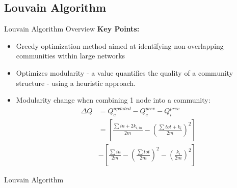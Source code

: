 \documentclass[compress]{beamer}
\begin{document}
\subsection{Louvain Algorithm}
\begin{frame}[t]{ Louvain Algorithm Overview}
    \textbf{Key Points:}
    \begin{itemize}
        \item  Greedy optimization method aimed at identifying non-overlapping communities within large networks
        \item  Optimizes modularity - a value quantifies the quality of a community structure - using a heuristic approach.
        \item Modularity change when combining 1 node into a community:
\[
\begin{aligned}
    \Delta Q&=Q_c^{updated}-Q_c^{prev}-Q_i^{prev}\\
    &=\left[\frac{\sum in + 2 k_{i,in}}{2m}-\left(\frac{\sum tot+k_i}{2m}\right)^2\right]\\
    &-\left[\frac{\sum in}{2m}-\left(\frac{\sum tot}{2m}\right)^2-\left(\frac{k_i}{2m}\right)^2\right]
\end{aligned}
\]
    \end{itemize}
\end{frame}

\begin{frame}[t]{Louvain Algorithm}
    \small\begin{algorithm}[H]
        \caption{Louvain}\label{alg:louvain}
    \end{algorithm}
\end{frame}
\end{document}
